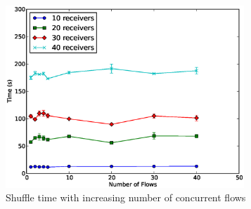 \documentclass[a4paper,12pt,twoside,openright]{report}
\begin{document}
\begin{figure}[h!]
  \centering
    \includegraphics[width=0.8\textwidth]{shuffle_flows.eps}
    \caption{Shuffle time with increasing number of concurrent flows}
    \label{chap:eval:sec:ciel:fig:shuffleflows}
\end{figure}
\end{document}
